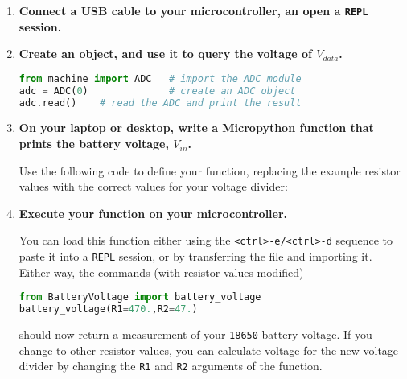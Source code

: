 \begin{enumerate}[resume]
	\item \textbf{Connect a USB cable to your microcontroller, an open a \texttt{REPL} session.}

	\item \textbf{Create an \adc object, and use it to query the voltage of $V_{data}$.}
\begin{lstlisting}[language=Python]
from machine import ADC   # import the ADC module
adc = ADC(0)              # create an ADC object
adc.read()    # read the ADC and print the result
\end{lstlisting}

	\item \textbf{On your laptop or desktop, write a Micropython function that prints the battery voltage, $V_{in}$.}

	Use the following code to define your function, replacing the example resistor values with the correct values for your voltage divider:

	

	\item \textbf{Execute your function on your microcontroller.}

	You can load this function either using the \texttt{<ctrl>-e/<ctrl>-d} sequence to paste it into a \texttt{REPL} session, or by transferring the file and importing it.
	Either way, the commands (with resistor values modified)
\begin{lstlisting}[language=Python]
from BatteryVoltage import battery_voltage
battery_voltage(R1=470.,R2=47.)
\end{lstlisting}
	should now return a measurement of your \texttt{\texttt{18650}} battery voltage.
	If you change to other resistor values, you can calculate voltage for the new voltage divider by changing the \texttt{R1} and \texttt{R2} arguments of the function.
\end{enumerate}


